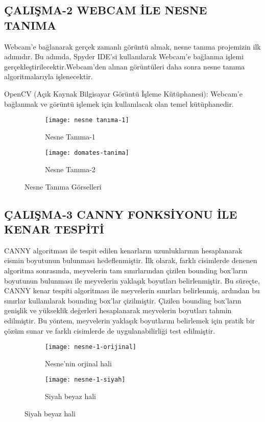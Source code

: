 \documentclass[11pt,a4paper]{report}
\begin{document}
\begin{justify}
   	\subsection{ÇALIŞMA-2  WEBCAM İLE NESNE TANIMA }
   	Webcam'e bağlanarak gerçek zamanlı görüntü almak, nesne tanıma projemizin ilk adımıdır. Bu adımda, Spyder IDE'si kullanılarak Webcam'e bağlanma işlemi gerçekleştirilecektir.Webcam'den alınan görüntüleri daha sonra nesne tanıma algoritmalarıyla işlenecektir.
   	\newline
   	
   	OpenCV (Açık Kaynak Bilgisayar Görüntü İşleme Kütüphanesi): Webcam'e bağlanmak ve görüntü işlemek için kullanılacak olan temel kütüphanedir.
   	
\begin{figure}[!h]
	\centering
	\begin{subfigure}{0.45\textwidth}
		\centering
		\texttt{[image: nesne tanıma-1]}
		\caption{Nesne Tanıma-1}
	\end{subfigure}
	\hfill
	\begin{subfigure}{0.45\textwidth}
		\centering
		\texttt{[image: domates-tanima]}
		\caption{Nesne Tanıma-2}
	\end{subfigure}
	\caption{Nesne Tanıma Görselleri}
\end{figure}
\clearpage

\subsection{ÇALIŞMA-3  CANNY FONKSİYONU İLE KENAR TESPİTİ }

CANNY algoritması ile tespit edilen kenarların uzunluklarının hesaplanarak cismin boyutunun bulunması hedeflenmiştir. İlk olarak, farklı cisimlerde denenen algoritma sonrasında, meyvelerin tam sınırlarından çizilen bounding box'ların boyutunun bulunması ile meyvelerin yaklaşık boyutları belirlenmiştir. Bu süreçte, CANNY kenar tespiti algoritması ile meyvelerin sınırları belirlenmiş, ardından bu sınırlar kullanılarak bounding box'lar çizilmiştir. Çizilen bounding box'ların genişlik ve yükseklik değerleri hesaplanarak meyvelerin boyutları tahmin edilmiştir. Bu yöntem, meyvelerin yaklaşık boyutlarını belirlemek için pratik bir çözüm sunar ve farklı cisimlerde de uygulanabilirliği test edilmiştir.
\newline

	
\begin{figure}[!h] %
	\centering
	\begin{subfigure}[t]{0.47\linewidth}
		\centering
		\texttt{[image: nesne-1-orijinal]}
		\caption{Nesne'nin orjinal hali}
	\end{subfigure}\hfill
	\begin{subfigure}[t]{0.5\linewidth}
		\centering
		\texttt{[image: nesne-1-siyah]}
		\caption{Siyah beyaz hali}
	\end{subfigure}


\end{figure}
\end{justify}
\end{document}
